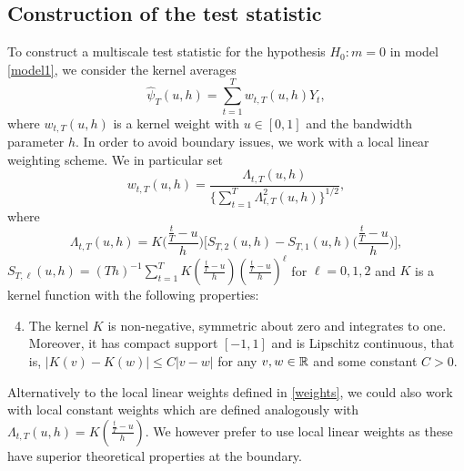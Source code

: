 \subsection{Construction of the test statistic}\label{subsec-method-stat}


To construct a multiscale test statistic for the hypothesis $H_0: m = 0$ in model \eqref{model1}, we consider the kernel averages
\begin{equation*}
\widehat{\psi}_T(u,h) = \sum\limits_{t=1}^T w_{t,T}(u,h) Y_t, 
\end{equation*}
where $w_{t,T}(u,h)$ is a kernel weight with $u \in [0,1]$ and the bandwidth parameter $h$. In order to avoid boundary issues, we work with a local linear weighting scheme. We in particular set 
\begin{equation}\label{weights}
w_{t,T}(u,h) = \frac{\Lambda_{t,T}(u,h)}{ \{\sum\nolimits_{t=1}^T \Lambda_{t,T}^2(u,h)\}^{1/2} }, 
\end{equation}
where
\[ \Lambda_{t,T}(u,h) = K\Big(\frac{\frac{t}{T}-u}{h}\Big) \Big[ S_{T,2}(u,h) - S_{T,1}(u,h) \Big(\frac{\frac{t}{T}-u}{h}\Big) \Big], \]
$S_{T,\ell}(u,h) = (Th)^{-1} \sum\nolimits_{t=1}^T K(\frac{\frac{t}{T}-u}{h}) (\frac{\frac{t}{T}-u}{h})^\ell$ for $\ell = 0,1,2$ and $K$ is a kernel function with the following properties: 
\begin{enumerate}[label=(C\arabic*),leftmargin=1.05cm]
\setcounter{enumi}{3}
\item \label{C-ker} The kernel $K$ is non-negative, symmetric about zero and integrates to one. Moreover, it has compact support $[-1,1]$ and is Lipschitz continuous, that is, $|K(v) - K(w)| \le C |v-w|$ for any $v,w \in \mathbb{R}$ and some constant $C > 0$. 
\end{enumerate} 
Alternatively to the local linear weights defined in \eqref{weights}, we could also work with local constant weights which are defined analogously with $\Lambda_{t,T}(u,h) = K(\frac{\frac{t}{T}-u}{h})$. We however prefer to use local linear weights as these have superior theoretical properties at the boundary.  


